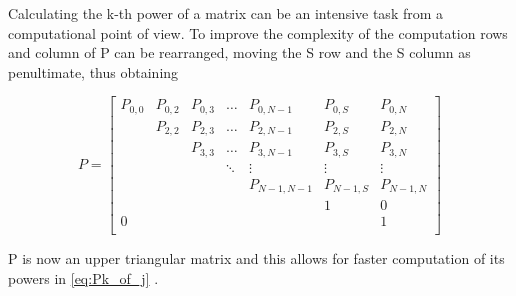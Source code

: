 Calculating the k-th power of a matrix can be an intensive task from a computational point of view. To improve the complexity of the computation rows and column of P can be rearranged, moving the S row and the S column as penultimate, thus obtaining

\begin{equation*}
P = 
\begin{bmatrix}
P_{0,0}	& P_{0,2}	& P_{0,3}  	& \dots	& P_{0, N-1}	& P_{0,S}	& P_{0,N} \\
		& P_{2,2}	& P_{2,3}  	& \dots	& P_{2, N-1}	& P_{2,S}	& P_{2,N} \\
		& 			& P_{3,3}	& \dots	& P_{3, N-1}	& P_{3,S}	& P_{3,N} \\
 		& 			& 			& \ddots& \vdots		& \vdots	& \vdots \\
		& 			& 			& 		& P_{N-1,N-1}	& P_{N-1,S}	& P_{N-1, N}\\
		& 			& 			& 		& 				& 1			& 0		 \\
0		& 			& 		  	& 		& 				& 			& 1		 \\
\end{bmatrix}
\label{triangularPMatrix}
\end{equation*}
\hfill \break

P is now an upper triangular matrix and this allows for faster computation of its powers in \ref{eq:Pk_of_j} .


